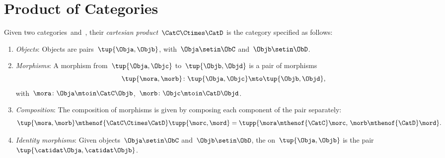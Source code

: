 
\section{Product of Categories}

\begin{ctdefinition}
    \label{def:cartesian-product-category}
    Given two categories~\CatC and~\CatD, their \emph{cartesian product}~$\CatC \Ctimes \CatD$ is the category specified as follows:
    \begin{enumerate}
        \item \emph{Objects}: Objects are pairs~$\tup{\Obja,\Objb}$, with~$\Obja\setin \ObC$ and~$\Objb\setin \ObD$.
        \item \emph{Morphisms}: A morphism from~$\tup{\Obja, \Objc}$ to~$\tup{\Objb,\Objd}$ is a pair of morphisms
              \begin{equation}\label{eq:prod-cat-morphisms}
                  \tup{\mora,\morb} \colon \tup{\Obja,\Objc}\mto \tup{\Objb,\Objd},
              \end{equation}
              with~$\mora\colon \Obja \mtoin\CatC \Objb$,~$\morb\colon \Objc\mtoin\CatD \Objd$.
                \item \emph{Composition}: The composition of morphisms is given by composing each component of the pair separately:
              \begin{equation}
                  \tup{\mora,\morb}\mthenof{\CatC\Ctimes\CatD} \tupp{\morc,\mord}=\tupp{\mora\mthenof{\CatC}\morc,\, \morb \mthenof{\CatD} \mord}.
              \end{equation}
              \item \emph{Identity morphisms}: Given objects~$\Obja\setin \ObC$ and~$\Objb\setin \ObD$, the  on~$\tup{\Obja,\Objb}$ is the pair $\tup{\catidat\Obja,\catidat\Objb}$.
    \end{enumerate}
\end{ctdefinition}



